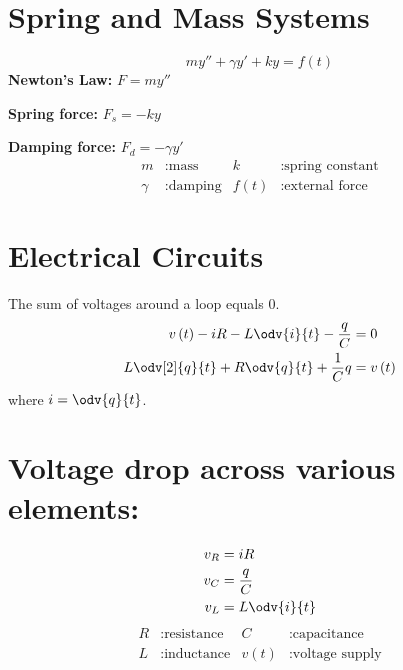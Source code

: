 \documentclass{article}
\begin{document}
\begin{multicols}{3}
    \section*{Spring and Mass Systems}
    \begin{equation*}
        m y'' + \gamma y' + k y = f\left( t \right)
    \end{equation*}
    \textbf{Newton's Law:} \(F = m y''\)

    \textbf{Spring force:} \(F_s = -k y\)

    \textbf{Damping force:} \(F_d = -\gamma y'\)
    \begin{align*}
        m      & : \text{mass}    & k                 & : \text{spring constant} \\
        \gamma & : \text{damping} & f\left( t \right) & : \text{external force}
    \end{align*}
    \section*{Electrical Circuits}
    The sum of voltages around a loop equals 0.
    \begin{align*}
        v\left( t \right) - iR - L \odv{i}{t} - \frac{q}{C} & = 0                 \\
        L \odv[2]{q}{t} + R\odv{q}{t} + \frac{1}{C}q        & = v\left( t \right)
    \end{align*}
    where \(\displaystyle i = \odv{q}{t}\).
    \section*{Voltage drop across various elements:}
    \begin{align*}
        v_R & = iR           \\
        v_C & = \frac{q}{C}  \\
        v_L & = L \odv{i}{t}
    \end{align*}
    \begin{align*}
        R & : \text{resistance} & C                 & : \text{capacitance}    \\
        L & : \text{inductance} & v\left( t \right) & : \text{voltage supply}
    \end{align*}
\end{multicols}
\end{document}
